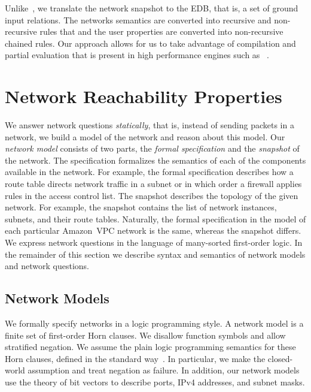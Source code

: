 Unlike~\cite{beliefs}, we translate the network snapshot to the 
EDB, that is, a set of ground input relations. The networks semantics are converted into 
recursive and non-recursive \Datalog rules that and the user properties are converted into 
non-recursive chained rules. Our approach allows for us to take advantage of compilation and 
partial evaluation that is present in high performance \Datalog engines such as 
\souffle~\cite{souffle}.



\section{Network Reachability Properties}
\label{sect:aws/specification}
We answer network questions \emph{statically}, that is, instead of sending packets in a network, we build a model of the network and reason about this model. Our \emph{network model} consists of two parts, the \emph{formal specification} and the \emph{snapshot} of the network. The specification formalizes the semantics of each of the components available in the network. For example, the formal specification describes how a route table directs network traffic in a subnet or in which order a firewall applies rules in the access control list. The snapshot describes the topology of the given network. For example, the snapshot contains the list of network instances, subnets, and their route tables. Naturally, the formal specification in the model of each particular Amazon~VPC network is the same, whereas the snapshot differs. We express network questions in the language of many-sorted first-order logic. In the remainder of this section we describe syntax and semantics of network models and network questions.


\subsection{Network Models}
\label{sect:aws/reachability/spec}
We formally specify networks in a logic programming style. A network model is a finite set of first-order Horn clauses. We disallow function symbols and allow stratified negation. We assume the plain logic programming semantics for these Horn clauses, defined in the standard way~\cite{}. In particular, we make the closed-world assumption and treat negation as failure. In addition, our network models use the theory of bit vectors to describe ports, IPv4 addresses, and subnet masks.

